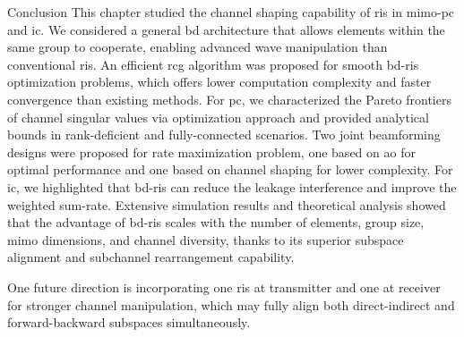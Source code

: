 \begin{section}{Conclusion}
	This chapter studied the channel shaping capability of \gls{ris} in \gls{mimo}-\gls{pc} and \gls{ic}.
	We considered a general \gls{bd} architecture that allows elements within the same group to cooperate, enabling advanced wave manipulation than conventional \gls{ris}.
	An efficient \gls{rcg} algorithm was proposed for smooth \gls{bd}-\gls{ris} optimization problems, which offers lower computation complexity and faster convergence than existing methods.
	For \gls{pc}, we characterized the Pareto frontiers of channel singular values via optimization approach and provided analytical bounds in rank-deficient and fully-connected scenarios.
	Two joint beamforming designs were proposed for rate maximization problem, one based on \gls{ao} for optimal performance and one based on channel shaping for lower complexity.
	For \gls{ic}, we highlighted that \gls{bd}-\gls{ris} can reduce the leakage interference and improve the weighted sum-rate.
	Extensive simulation results and theoretical analysis showed that the advantage of \gls{bd}-\gls{ris} scales with the number of elements, group size, \gls{mimo} dimensions, and channel diversity, thanks to its superior subspace alignment and subchannel rearrangement capability.

	One future direction is incorporating one \gls{ris} at transmitter and one at receiver for stronger channel manipulation, which may fully align both direct-indirect and forward-backward subspaces simultaneously.
\end{section}
